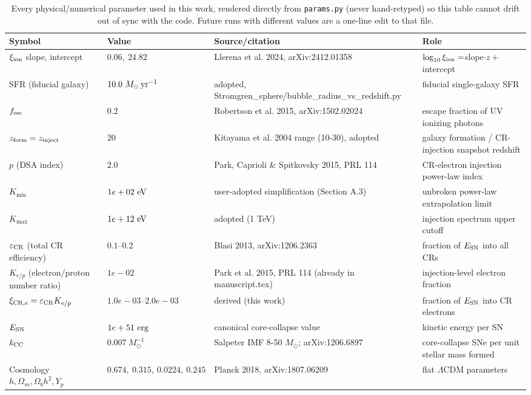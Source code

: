 \begin{table}[H]
\centering
\caption{Every physical/numerical parameter used in this work, rendered directly from \texttt{params.py} (never hand-retyped) so this table cannot drift out of sync with the code. Future runs with different values are a one-line edit to that file.}
\label{tab:params}
\small
\begin{tabular}{@{}p{4.3cm}p{3.6cm}p{4.2cm}p{4.3cm}@{}}
\toprule
Symbol & Value & Source/citation & Role \\
\midrule
$\xi_{\rm ion}$ slope, intercept & $0.06,\ 24.82$ & Llerena et al. 2024, arXiv:2412.01358 & $\log_{10}\xi_{\rm ion}=$slope$\cdot z+$intercept \\
SFR (fiducial galaxy) & $10.0\ M_\odot\,{\rm yr}^{-1}$ & adopted, Stromgren\_sphere/bubble\_radius\_vs\_redshift.py & fiducial single-galaxy SFR \\
$f_{\rm esc}$ & $0.2$ & Robertson et al. 2015, arXiv:1502.02024 & escape fraction of UV ionizing photons \\
$z_{\rm form}=z_{\rm inject}$ & $20$ & Kitayama et al. 2004 range (10-30), adopted & galaxy formation / CR-injection snapshot redshift \\
$p$ (DSA index) & $2.0$ & Park, Caprioli \& Spitkovsky 2015, PRL 114 & CR-electron injection power-law index \\
$K_{\min}$ & $1e+02\ {\rm eV}$ & user-adopted simplification (Section A.3) & unbroken power-law extrapolation limit \\
$K_{\max}$ & $1e+12\ {\rm eV}$ & adopted (1 TeV) & injection spectrum upper cutoff \\
$\varepsilon_{\rm CR}$ (total CR efficiency) & $0.1\text{--}0.2$ & Blasi 2013, arXiv:1206.2363 & fraction of $E_{\rm SN}$ into all CRs \\
$K_{e/p}$ (electron/proton number ratio) & $1e-02$ & Park et al. 2015, PRL 114 (already in manuscript.tex) & injection-level electron fraction \\
$\xi_{\rm CR,e}=\varepsilon_{\rm CR}K_{e/p}$ & $1.0e-03\text{--}2.0e-03$ & derived (this work) & fraction of $E_{\rm SN}$ into CR electrons \\
$E_{\rm SN}$ & $1e+51\ {\rm erg}$ & canonical core-collapse value & kinetic energy per SN \\
$k_{\rm CC}$ & $0.007\ M_\odot^{-1}$ & Salpeter IMF 8-50 $M_\odot$; arXiv:1206.6897 & core-collapse SNe per unit stellar mass formed \\
Cosmology $h,\Omega_m,\Omega_b h^2,Y_p$ & $0.674,\ 0.315,\ 0.0224,\ 0.245$ & Planck 2018, arXiv:1807.06209 & flat $\Lambda$CDM parameters \\

\end{tabular}
\end{table}
